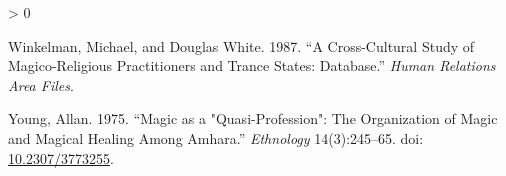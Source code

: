 \documentclass[
  11pt,
]{article}
\newlength{\cslhangindent}
\newenvironment{CSLReferences}[2] %
 {%
  \setlength{\parindent}{0pt}
  \ifodd #1 \everypar{\setlength{\hangindent}{\cslhangindent}}\ignorespaces\fi
  \ifnum #2 > 0
  \setlength{\parskip}{#2\baselineskip}
  \fi
 }%
 {}
\begin{document}
\begin{CSLReferences}{1}{0}
\leavevmode\hypertarget{ref-winkelmanCrossculturalStudyMagicoreligious}{}%
Winkelman, Michael, and Douglas White. 1987. {``A Cross-Cultural Study of Magico-Religious Practitioners and Trance States: Database.''} \emph{Human Relations Area Files}.

\leavevmode\hypertarget{ref-youngMagicQuasiProfessionOrganization1975}{}%
Young, Allan. 1975. {``Magic as a "{Quasi}-{Profession}": {The Organization} of {Magic} and {Magical Healing} Among {Amhara}.''} \emph{Ethnology} 14(3):245--65. doi: \href{https://doi.org/10.2307/3773255}{10.2307/3773255}.

\end{CSLReferences}
\end{document}
